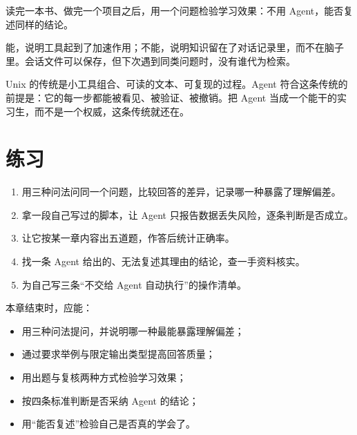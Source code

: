 读完一本书、做完一个项目之后，用一个问题检验学习效果：不用 Agent，能否复述同样的结论。

能，说明工具起到了加速作用；不能，说明知识留在了对话记录里，而不在脑子里。会话文件可以保存，但下次遇到同类问题时，没有谁代为检索。

\begin{culturenote}
Unix 的传统是小工具组合、可读的文本、可复现的过程。Agent 符合这条传统的前提是：它的每一步都能被看见、被验证、被撤销。把 Agent 当成一个能干的实习生，而不是一个权威，这条传统就还在。
\end{culturenote}

\section{练习}

\begin{enumerate}
  \item 用三种问法问同一个问题，比较回答的差异，记录哪一种暴露了理解偏差。
  \item 拿一段自己写过的脚本，让 Agent 只报告数据丢失风险，逐条判断是否成立。
  \item 让它按某一章内容出五道题，作答后统计正确率。
  \item 找一条 Agent 给出的、无法复述其理由的结论，查一手资料核实。
  \item 为自己写三条“不交给 Agent 自动执行”的操作清单。
\end{enumerate}

\begin{checkpoint}
本章结束时，应能：
\begin{itemize}
  \item 用三种问法提问，并说明哪一种最能暴露理解偏差；
  \item 通过要求举例与限定输出类型提高回答质量；
  \item 用出题与复核两种方式检验学习效果；
  \item 按四条标准判断是否采纳 Agent 的结论；
  \item 用“能否复述”检验自己是否真的学会了。
\end{itemize}
\end{checkpoint}
